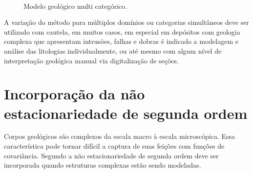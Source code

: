 \begin{figure}[H]
\caption{Modelo geológico multi categórico.} 
\label{multi_cat_rbf}
\begin{center}
\\
\end{center}
\begin{center}
\end{center}
\end{figure}

A variação do método para múltiplos domínios ou categorias simultâneos deve ser utilizado com cautela, em muitos casos, em especial em depósitos com geologia complexa que apresentam intrusões, falhas e dobras é indicado a modelagem e análise das litologias individualmente, ou até mesmo com algum nível de interpretação geológica manual via digitalização de seções.

\section{Incorporação da não estacionariedade de segunda ordem}

Corpos geológicos são complexos da escala macro à escala microscópica. Essa característica pode tornar difícil a captura de suas feições com funções de covariância. Segundo  a não estacionariedade de segunda ordem deve ser incorporada quando estruturas complexas estão sendo modeladas.


